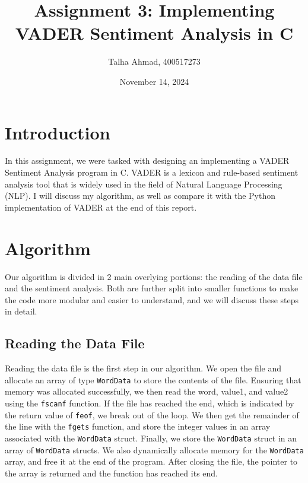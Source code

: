 \documentclass[12pt]{article}
\begin{document}
\title{Assignment 3: Implementing VADER Sentiment Analysis in C}
\author{Talha Ahmad, 400517273}
\date{November 14, 2024}
\maketitle

\section{Introduction}

In this assignment, we were tasked with designing an implementing a VADER Sentiment Analysis program in C.
VADER is a lexicon and rule-based sentiment analysis tool that is widely used in the field of Natural Language Processing (NLP).
I will discuss my algorithm, as well as compare it with the Python implementation of VADER at the end of this report.

\section{Algorithm}

Our algorithm is divided in 2 main overlying portions: the reading of the data file and the sentiment analysis.
Both are further split into smaller functions to make the code more modular and easier to understand, and we will discuss these steps in detail.

\subsection{Reading the Data File}

Reading the data file is the first step in our algorithm.
We open the file and allocate an array of type \texttt{WordData} to store the contents of the file.
Ensuring that memory was allocated successfully, we then read the word, value1, and value2 using the \texttt{fscanf} function.
If the file has reached the end, which is indicated by the return value of \texttt{feof}, we break out of the loop.
We then get the remainder of the line with the \texttt{fgets} function, and store the integer values in an array associated with the \texttt{WordData} struct.
Finally, we store the \texttt{WordData} struct in an array of \texttt{WordData} structs.
We also dynamically allocate memory for the \texttt{WordData} array, and free it at the end of the program.
After closing the file, the pointer to the array is returned and the function has reached its end.
\end{document}
